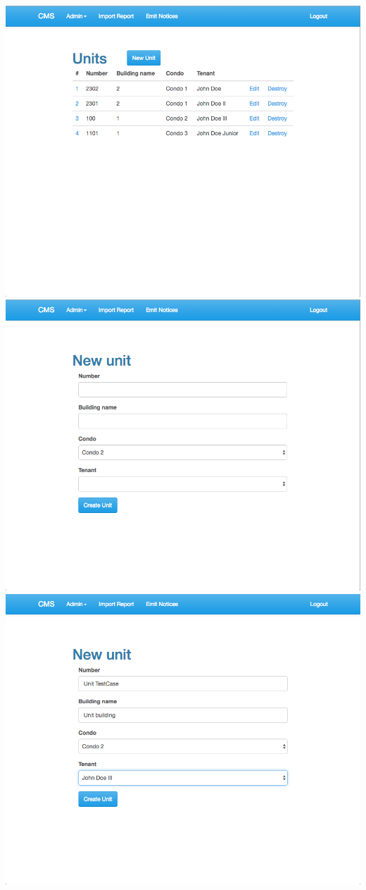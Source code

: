 \begin{itemize}
    \includegraphics[scale=0.25]{./images/ss/unit/create/2.png}\\
    \includegraphics[scale=0.25]{./images/ss/unit/create/3.png}
    \includegraphics[scale=0.25]{./images/ss/unit/create/4.png}\\

\end{itemize}
